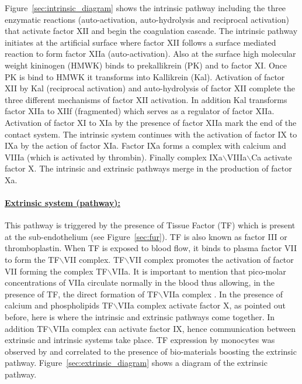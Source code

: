 \documentclass[%
 nofootinbib,
 amsmath,amssymb,
 aps,
 pra,
]{revtex4-1}
\begin{document}
Figure~\ref{sec:intrinsic_diagram} shows the intrinsic pathway including the three enzymatic reactions (auto-activation, auto-hydrolysis and reciprocal activation) that activate factor XII and begin the coagulation cascade. The intrinsic pathway initiates at the artificial surface where factor XII follows a surface mediated reaction to form factor XIIa (auto-activation). Also at the surface %
high molecular weight kininogen (HMWK) binds to prekallikrein %
 (PK) and to factor XI. Once PK is bind to HMWK it transforms into %
Kallikrein (Kal). Activation of factor XII by Kal (reciprocal activation) and auto-hydrolysis of factor XII complete the three different mechanisms of factor XII activation. In addition Kal transforms factor XIIa to XIIf (fragmented) which serves as a regulator of factor XIIa. Activation of factor XI to XIa by the presence of factor XIIa mark the end of the contact system. The intrinsic system continues with the activation of factor IX to IXa by the action of factor XIa. Factor IXa forms a complex with calcium and VIIIa (which is activated by thrombin). Finally complex IXa$\backslash$VIIIa$\backslash$Ca activate factor X. The intrinsic and extrinsic pathways merge in the production of factor Xa. \\

\paragraph{\underline{Extrinsic system (pathway):}}
This pathway is triggered by the presence of %
Tissue Factor (TF) which is present at the sub-endothelium (see Figure~\ref{sec:fur}). TF is also known as factor III or thromboplastin. When TF is exposed to blood flow, it binds to plasma factor VII to form the TF$\backslash$VII complex. TF$\backslash$VII complex promotes the activation of factor VII forming the complex TF$\backslash$VIIa. It is important to mention that pico-molar concentrations of VIIa circulate normally in the blood thus allowing, in the presence of TF, the direct formation of TF$\backslash$VIIa complex \citep{Gorbet:2004}. In the presence of calcium and phospholipids TF$\backslash$VIIa complex activate factor X, as pointed out before, here is where the intrinsic and extrinsic pathways come together. In addition TF$\backslash$VIIa complex can activate factor IX, hence communication between extrinsic and intrinsic systems take place. TF expression by monocytes was observed by \citet{Wilhelm:1998} and correlated to the presence of bio-materials boosting the extrinsic pathway. Figure~\ref{sec:extrinsic_diagram} shows a diagram of the extrinsic pathway.\\
\end{document}
